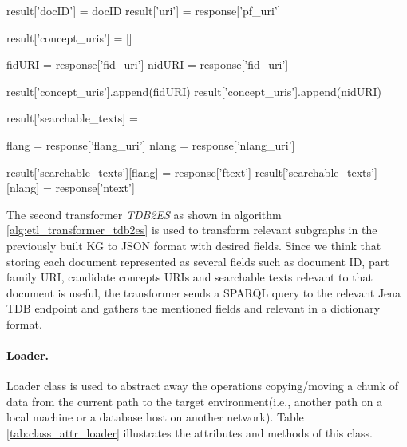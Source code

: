\begin{algorithm}[H]
\begin{algorithmic}                   %
	\State result['docID'] = docID		
	\State result['uri'] = response['pf\_uri']		

		\State result['concept\_uris'] = []	
	\EndIf

	\State fidURI = response['fid\_uri']	
	\State nidURI = response['fid\_uri']	

		\State result['concept\_uris'].append(fidURI)
	\EndIf
		\State result['concept\_uris'].append(nidURI)
	\EndIf

		\State result['searchable\_texts] = {}	
	\EndIf

	\State flang = response['flang\_uri']	
	\State nlang = response['nlang\_uri']	

	result['searchable\_texts'][flang] = response['ftext']	
	result['searchable\_texts'][nlang] = response['ntext']	
\EndFor
\end{algorithmic}
\end{algorithm}

The second transformer \textit{TDB2ES} as shown in algorithm \ref{alg:etl_transformer_tdb2es} is used 
to transform relevant subgraphs in the previously built KG to JSON format with desired fields. 
Since we think that storing each 
document represented as several fields such as document ID, part family URI, candidate concepts URIs 
and searchable texts relevant to that document is useful, the transformer sends a SPARQL query to 
the relevant Jena TDB endpoint and gathers the mentioned fields and relevant in a dictionary format.

\paragraph{Loader.}
Loader class is used to abstract away the operations copying/moving a chunk of data from the current 
path to the target environment(i.e., another path on a local machine or a database host on another 
network). Table \ref{tab:class_attr_loader} illustrates the attributes and methods of this class.

